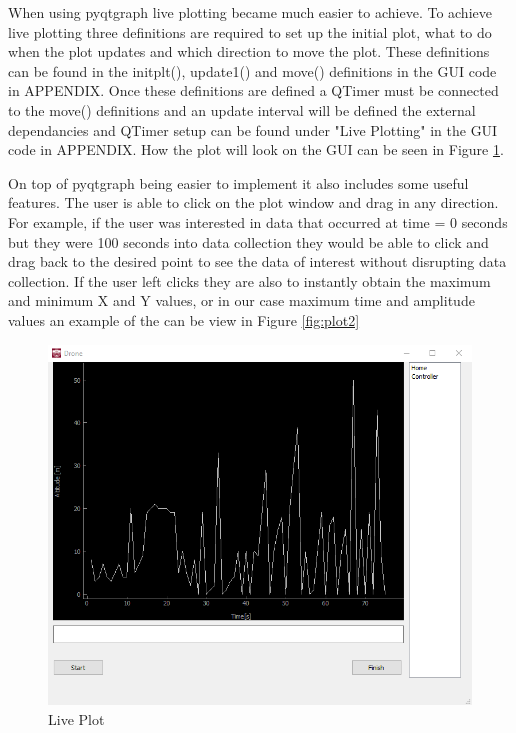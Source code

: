 When using pyqtgraph live plotting became much easier to achieve. To achieve live plotting three definitions are required to set up the initial plot, what to do when the plot updates and which direction to move the plot. These definitions can be found in the initplt(), update1() and move() definitions in the GUI code in APPENDIX. Once these definitions are defined a QTimer must be connected to the move() definitions and an update interval will be defined the external dependancies and QTimer setup can be found under "Live Plotting" in the GUI code in APPENDIX. How the plot will look on the GUI can be seen in Figure \ref{fig:plt}.

On top of pyqtgraph being easier to implement it also includes some useful features.
The user is able to click on the plot window and drag in any direction. For example, if the user was interested in data that occurred at time = 0 seconds but they were 100 seconds into data collection they would be able to click and drag back to the desired point to see the data of interest without disrupting data collection. If the user left clicks they are also to instantly obtain the maximum and minimum X and Y values, or in our case maximum time and amplitude values an example of the can be view in Figure \ref{fig:plot2}
\begin{figure}[H]
	\includegraphics[width=\linewidth]{plot.png}
	\caption{Live Plot}
	\label{fig:plt}
\end{figure}
